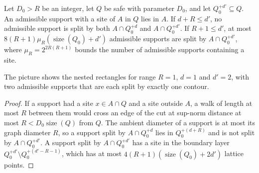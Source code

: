 \begin{lemma}
    \label{thm:area_law_buffer_contours}
    \leanok
    Let $D_0>R$ be an integer, let $Q$ be safe with parameter $D_0$,
    and let $Q_0^{+d'}\subseteq Q$. An admissible support with
    a site of $A$ in $Q$ lies in $A$. If $d+R\le d'$, no admissible support is
    split by both $A\cap Q_0^{+d}$ and $A\cap Q_0^{+d'}$. If $R+1\le d'$, at most
    $8(R+1)\mu_R(\operatorname{size}(Q_0)+d')$ admissible supports are split by
    $A\cap Q_0^{+d'}$, where $\mu_R=2^{2R(R+1)}$ bounds the number of admissible
    supports containing a site.

    The picture shows the nested rectangles for range $R=1$, $d=1$ and
    $d'=2$, with two admissible supports that are each split by exactly one
    contour.
    
\end{lemma}
\begin{proof}\leanok
    If a support had a site $x\in A\cap Q$ and a site outside $A$, a walk of
    length at most $R$ between them would cross an edge of the cut at sup-norm
    distance at most $R<D_0\operatorname{size}(Q)$ from $Q$. The ambient
    diameter of a support is at most its graph diameter $R$, so a support split
    by $A\cap Q_0^{+d}$ lies in $Q_0^{+(d+R)}$ and is not split by
    $A\cap Q_0^{+d'}$. A support split by $A\cap Q_0^{+d'}$ has a site in the
    boundary layer $Q_0^{+d'}\setminus Q_0^{+(d'-R-1)}$, which has at most
    $4(R+1)(\operatorname{size}(Q_0)+2d')$ lattice points.
\end{proof}

